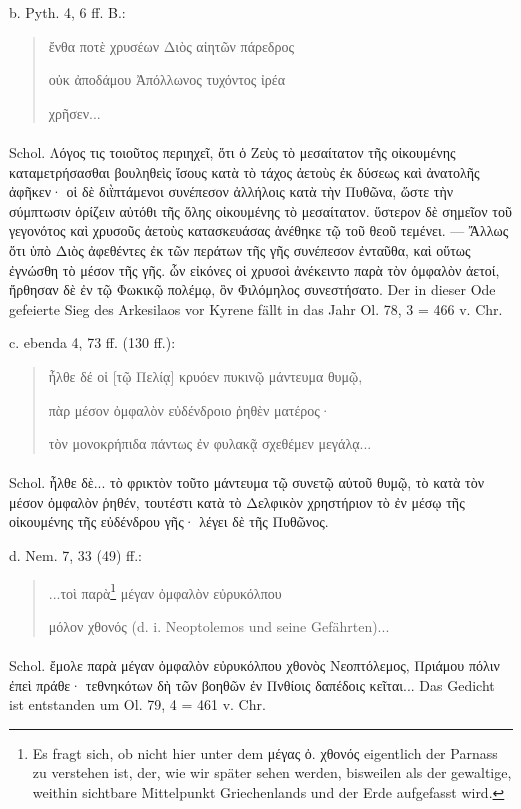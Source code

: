 \documentclass[a4paper, 11pt, oneside]{article}
\begin{document}
b. Pyth. 4, 6 ff. B.:
\begin{quotation}
ἔνθα ποτὲ χρυσέων Διὸς αἰητῶν πάρεδρος

οὐκ ἀποδάμου Ἀπόλλωνος τυχόντος ἰρέα

χρῆσεν...
\end{quotation}
\paragraph{}
Schol. Λόγος τις τοιοῦτος περιηχεῖ, ὅτι ὁ Ζεὺς τὸ μεσαίτατον τῆς οἰκουμένης καταμετρήσασθαι βουληθεὶς ἴσους κατὰ τὸ τάχος ἀετοὺς ἐκ δύσεως καὶ ἀνατολῆς ἀφῆκεν· οἱ δὲ διῒπτάμενοι συνέπεσον ἀλλήλοις κατὰ τὴν Πυθῶνα, ὥστε τὴν σύμπτωσιν ὁρίζειν αὐτόθι τῆς ὅλης οἰκουμένης τὸ μεσαίτατον. ὕστερον δὲ σημεῖον τοῦ γεγονότος καὶ χρυσοῦς ἀετοὺς κατασκευάσας ἀνέθηκε τῷ τοῦ θεοῦ τεμένει. --- Ἄλλως ὅτι ὑπὸ Διὸς ἀφεθέντες ἐκ τῶν περάτων τῆς γῆς συνέπεσον ἐνταῦθα, καὶ οὕτως ἐγνώσθη τὸ μέσον τῆς γῆς. ὧν εἰκόνες οἱ χρυσοὶ ἀνέκειντο παρὰ τὸν ὀμφαλὸν ἀετοί, ἤρθησαν δὲ ἐν τῷ Φωκικῷ πολέμῳ, ὃν Φιλόμηλος συνεστήσατο. Der in dieser Ode gefeierte Sieg des Arkesilaos vor Kyrene fällt in das Jahr Ol. 78, 3 = 466 v. Chr.

c. ebenda 4, 73 ff. (130 ff.):
\begin{quotation}
ἦλθε δέ οἱ [τῷ Πελίᾳ] κρυόεν πυκινῷ μάντευμα θυμῷ,

πὰρ μέσον ὀμφαλὸν εὐδένδροιο ῥηθὲν ματέρος·

τὸν μονοκρήπιδα πάντως ἐν φυλακᾷ σχεθέμεν μεγάλᾳ...
\end{quotation}
\paragraph{}
Schol. ἦλθε δὲ... τὸ φρικτὸν τοῦτο μάντευμα τῷ συνετῷ αὐτοῦ θυμῷ, τὸ κατὰ τὸν μέσον ὀμφαλὸν ῥηθέν, τουτέστι κατὰ τὸ Δελφικὸν χρηστήριον τὸ ἐν μέσῳ τῆς οἰκουμένης τῆς εὐδένδρου γῆς· λέγει δὲ τῆς Πυθῶνος.

d. Nem. 7, 33 (49) ff.:
\begin{quotation}
...τοὶ παρὰ\footnote{Es fragt sich, ob nicht hier unter dem μέγας ὀ. χθονός eigentlich der Parnass zu verstehen ist, der, wie wir später sehen werden, bisweilen als der gewaltige, weithin sichtbare Mittelpunkt Griechenlands und der Erde aufgefasst wird.} μέγαν ὀμφαλὸν εὐρυκόλπου

μόλον χθονός (d. i. Neoptolemos und seine Gefährten)...
\end{quotation}
\paragraph{}
Schol. ἔμολε παρὰ μέγαν ὀμφαλὸν εὐρυκόλπου χθονὸς Νεοπτόλεμος, Πριάμου πόλιν ἐπεὶ πράθε· τεθνηκότων δὴ τῶν βοηθῶν ἐν Πνθίοις δαπέδοις κεῖται... Das Gedicht ist entstanden um Ol. 79, 4 = 461 v. Chr.
\end{document}
